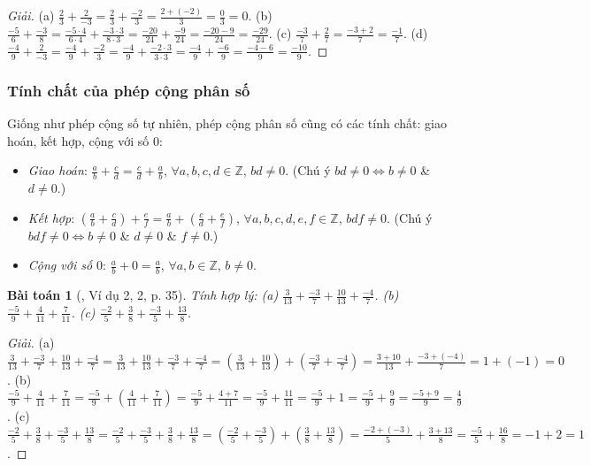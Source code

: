 \documentclass{article}
\newtheorem{baitoan}{Bài toán}
\begin{document}
\begin{proof}[Giải]
	(a) $\frac{2}{3} + \frac{2}{-3} = \frac{2}{3} + \frac{-2}{3} = \frac{2 + (-2)}{3} = \frac{0}{3} = 0$. (b) $\frac{-5}{6} + \frac{-3}{8} = \frac{-5\cdot4}{6\cdot4} + \frac{-3\cdot3}{8\cdot3} = \frac{-20}{24} + \frac{-9}{24} = \frac{-20 - 9}{24} = \frac{-29}{24}$. (c) $\frac{-3}{7} + \frac{2}{7} = \frac{-3 + 2}{7} = \frac{-1}{7}$. (d) $\frac{-4}{9} + \frac{2}{-3} = \frac{-4}{9} + \frac{-2}{3} = \frac{-4}{9} + \frac{-2\cdot3}{3\cdot3} = \frac{-4}{9} + \frac{-6}{9} = \frac{-4 - 6}{9} = \frac{-10}{9}$.
\end{proof}

\subsubsection{Tính chất của phép cộng phân số}
Giống như phép cộng số tự nhiên, phép cộng phân số cũng có các tính chất: giao hoán, kết hợp, cộng với số 0:
\begin{itemize}
	\item \textit{Giao hoán}: $\frac{a}{b} + \frac{c}{d} = \frac{c}{d} + \frac{a}{b}$, $\forall a,b,c,d\in\mathbb{Z}$, $bd\ne0$. (Chú ý $bd\ne0\Leftrightarrow b\ne0$ \& $d\ne0$.)
	\item \textit{Kết hợp}: $\left(\frac{a}{b} + \frac{c}{d}\right) + \frac{e}{f} = \frac{a}{b} + \left(\frac{c}{d} + \frac{e}{f}\right)$, $\forall a,b,c,d,e,f\in\mathbb{Z}$, $bdf\ne0$. (Chú ý $bdf\ne0\Leftrightarrow b\ne0$ \& $d\ne0$ \& $f\ne0$.)
	\item \textit{Cộng với số $0$}: $\frac{a}{b} + 0 = \frac{a}{b}$, $\forall a,b\in\mathbb{Z}$, $b\ne0$.
\end{itemize}

\begin{baitoan}[\cite{SGK_Toan_6_Canh_Dieu_tap_2}, Ví dụ 2, 2, p. 35]
	Tính hợp lý: (a) $\frac{3}{13} + \frac{-3}{7} + \frac{10}{13} + \frac{-4}{7}$. (b) $\frac{-5}{9} + \frac{4}{11} + \frac{7}{11}$. (c) $\frac{-2}{5} + \frac{3}{8} + \frac{-3}{5} + \frac{13}{8}$.
\end{baitoan}

\begin{proof}[Giải]
	(a) $\frac{3}{13} + \frac{-3}{7} + \frac{10}{13} + \frac{-4}{7} = \frac{3}{13} + \frac{10}{13} + \frac{-3}{7} + \frac{-4}{7} = \left(\frac{3}{13} + \frac{10}{13}\right) + \left(\frac{-3}{7} + \frac{-4}{7}\right) = \frac{3 + 10}{13} + \frac{-3 + (-4)}{7} = 1 + (-1) = 0$. (b) $\frac{-5}{9} + \frac{4}{11} + \frac{7}{11} = \frac{-5}{9} + \left(\frac{4}{11} + \frac{7}{11}\right) = \frac{-5}{9} + \frac{4 + 7}{11} = \frac{-5}{9} + \frac{11}{11} = \frac{-5}{9} + 1 = \frac{-5}{9} + \frac{9}{9} = \frac{-5 + 9}{9} = \frac{4}{9}$. (c) $\frac{-2}{5} + \frac{3}{8} + \frac{-3}{5} + \frac{13}{8} = \frac{-2}{5} + \frac{-3}{5} + \frac{3}{8} + \frac{13}{8} = \left(\frac{-2}{5} + \frac{-3}{5}\right) + \left(\frac{3}{8} + \frac{13}{8}\right) = \frac{-2 + (-3)}{5} + \frac{3 + 13}{8} = \frac{-5}{5} + \frac{16}{8} = -1 + 2 = 1$.
\end{proof}
\end{document}
